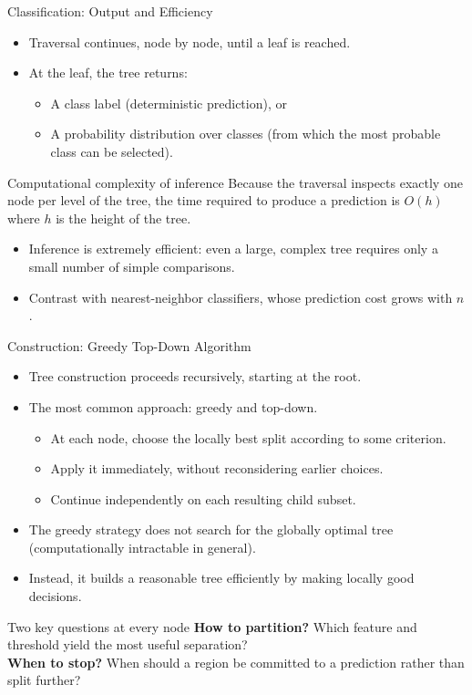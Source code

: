 \begin{frame}{Classification: Output and Efficiency}
  \begin{itemize}
    \item Traversal continues, node by node, until a \alert{leaf} is reached.
    \item At the leaf, the tree returns:
      \begin{itemize}
        \item A \alert{class label} (deterministic prediction), or
        \item A \alert{probability distribution} over classes (from which the most probable class
              can be selected).
      \end{itemize}
  \end{itemize}
  \begin{block}{Computational complexity of inference}
    Because the traversal inspects exactly one node per level of the tree, the time required
    to produce a prediction is \alert{$O(h)$} where $h$ is the height of the tree.
  \end{block}
  \begin{itemize}
    \item Inference is \alert{extremely efficient}: even a large, complex tree requires only a small
          number of simple comparisons.
    \item Contrast with nearest-neighbor classifiers, whose prediction cost \alert{grows with $n$}.
  \end{itemize}
\end{frame}

\begin{frame}{Construction: Greedy Top-Down Algorithm}
  \begin{itemize}
    \item Tree construction proceeds \alert{recursively}, starting at the root.
    \item The most common approach: \alert{greedy and top-down}.
      \begin{itemize}
        \item At each node, choose the locally best split according to some criterion.
        \item Apply it immediately, without reconsidering earlier choices.
        \item Continue independently on each resulting child subset.
      \end{itemize}
    \item The greedy strategy does not search for the \alert{globally optimal tree}
          (computationally intractable in general).
    \item Instead, it builds a reasonable tree efficiently by making \alert{locally good decisions}.
  \end{itemize}
  \begin{alertblock}{Two key questions at every node}
    \textbf{How to partition?} Which feature and threshold yield the most useful separation?\\
    \textbf{When to stop?} When should a region be committed to a prediction rather than split further?
  \end{alertblock}
\end{frame}

